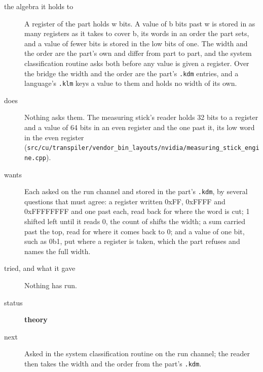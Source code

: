 \begin{description}
\item[{the algebra it holds to}] A register of the part holds w bits. A value of b bits past w is stored in as many registers as it takes to cover b, its words in an order the part sets, and a value of fewer bits is stored in the low bits of one. The width and the order are the part's own and differ from part to part, and the system classification routine asks both before any value is given a register. Over the bridge the width and the order are the part's \texttt{.\allowbreak{}kdm} entries, and a language's \texttt{.\allowbreak{}klm} keys a value to them and holds no width of its own.
\item[{does}] Nothing asks them. The measuring stick's reader holds 32 bits to a register and a value of 64 bits in an even register and the one past it, its low word in the even register (\texttt{src/\allowbreak{}cu/\allowbreak{}transpiler/\allowbreak{}vendor\_\allowbreak{}bin\_\allowbreak{}layouts/\allowbreak{}nvidia/\allowbreak{}measuring\_\allowbreak{}stick\_\allowbreak{}engine.\allowbreak{}cpp}).
\item[{wants}] Each asked on the run channel and stored in the part's \texttt{.\allowbreak{}kdm}, by several questions that must agree: a register written 0xFF, 0xFFFF and 0xFFFFFFFF and one past each, read back for where the word is cut; 1 shifted left until it reads 0, the count of shifts the width; a sum carried past the top, read for where it comes back to 0; and a value of one bit, such as 0b1, put where a register is taken, which the part refuses and names the full width.
\item[{tried, and what it gave}] Nothing has run.
\item[{status}] \textbf{theory}
\item[{next}] Asked in the system classification routine on the run channel; the reader then takes the width and the order from the part's \texttt{.\allowbreak{}kdm}.
\end{description}

